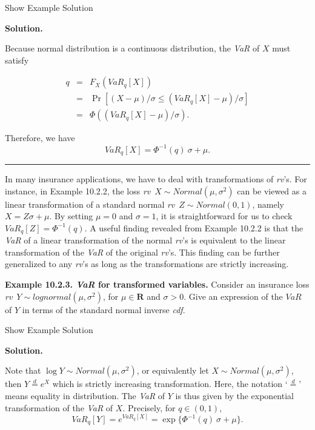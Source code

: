 \documentclass[]{book}
\theoremstyle{definition}
\theoremstyle{definition}
\theoremstyle{definition}
\theoremstyle{remark}
\begin{document}
Show Example Solution

\hypertarget{toggleExamplePortMgt.2.2}{}
\textbf{Solution.}

Because normal distribution is a continuous distribution, the \emph{VaR}
of \(X\) must satisfy

\begin{eqnarray*}
 q &=& F_X(VaR_q[X])\\
&=&\Pr\left[(X-\mu)/\sigma\leq (VaR_q[X]-\mu)/\sigma\right]\\
&=&\Phi((VaR_q[X]-\mu)/\sigma).
\end{eqnarray*}

Therefore, we have \[
VaR_q[X]=\Phi^{-1}(q)\ \sigma+\mu.
\]

\begin{center}\rule{0.5\linewidth}{\linethickness}\end{center}

In many insurance applications, we have to deal with transformations of
\emph{rv}'s. For instance, in Example 10.2.2, the loss
\emph{rv}~\(X\sim Normal(\mu, \sigma^2)\) can be viewed as a linear
transformation of a standard normal \emph{rv}~\(Z\sim Normal(0,1)\),
namely \(X=Z\sigma+\mu\). By setting \(\mu=0\) and \(\sigma=1\), it is
straightforward for us to check \(VaR_q[Z]=\Phi^{-1}(q).\) A useful
finding revealed from Example 10.2.2 is that the \emph{VaR} of a linear
transformation of the normal \emph{rv}'s is equivalent to the linear
transformation of the \emph{VaR} of the original \emph{rv}'s. This
finding can be further generalized to any \emph{rv}'s as long as the
transformations are strictly increasing.

\textbf{Example 10.2.3. \emph{VaR} for transformed variables.} Consider
an insurance loss \emph{rv}~\(Y\sim lognormal(\mu,\sigma^2)\), for
\(\mu\in \mathbf{R}\) and \(\sigma>0\). Give an expression of the
\(VaR\) of \(Y\) in terms of the standard normal inverse \emph{cdf}.

Show Example Solution

\hypertarget{toggleExamplePortMgt.2.3}{}
\textbf{Solution.}

Note that \(\log Y\sim Normal(\mu,\sigma^2)\), or equivalently let
\(X\sim Normal(\mu,\sigma^2)\), then \(Y\overset{d}{=}e^{X}\) which is
strictly increasing transformation. Here, the notation
`\(\overset{d}{=}\)' means equality in distribution. The \emph{VaR} of
\(Y\) is thus given by the exponential transformation of the \emph{VaR}
of \(X\). Precisely, for \(q\in (0,1)\), \[
VaR_{q}[Y]= e^{VaR_q[X]}=\exp\{\Phi^{-1}(q)\ \sigma+\mu\}.
\]
\end{document}
